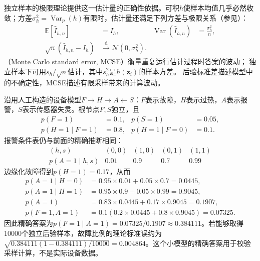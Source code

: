 独立样本的极限理论提供这一估计量的正确性依据。可积$h$使样本均值几乎必然收敛；方差$\sigma_h^2=\operatorname{Var}_p(h)$有限时，估计量还满足下列方差与极限关系（参见）：
\begin{equation}
  \begin{aligned}
    \mathbb{E}[\widehat I_{h,n}]&=I_h,&
    \operatorname{Var}(\widehat I_{h,n})&=\frac{\sigma_h^2}{n},\\
    \sqrt n(\widehat I_{h,n}-I_h)&\xrightarrow{\mathrm{d}}
      \mathcal{N}(0,\sigma_h^2).
  \end{aligned}
  \label{eq:pgm-sampling-iid-clt}
\end{equation}
（Monte Carlo standard error, MCSE）衡量重复运行估计过程时答案的波动；
独立样本下可用$s_h/\sqrt n$估计，其中$s_h^2$是$h(\bm z_i)$的样本方差。
后验标准差描述模型中的不确定性，MCSE描述有限采样带来的计算波动。


\begin{example}[报警后的故障概率]
  \label{ex:pgm-sampling-device}
  沿用人工构造的设备模型$F\to H\to A\leftarrow S$：$F$表示故障，$H$表示过热，$A$表示报警，$S$表示传感器失灵。根节点$F,S$独立，且
  \[
    \begin{aligned}
      p(F=1)&=0.1,&p(S=1)&=0.05,\\
      p(H=1\mid F=1)&=0.8,&
      p(H=1\mid F=0)&=0.1.
    \end{aligned}
  \]
  报警条件表仍与前面的精确推断相同：
  \[
    \begin{array}{ccccc}
      (h,s)&(0,0)&(1,0)&(0,1)&(1,1)\\
      p(A=1\mid h,s)&0.01&0.9&0.7&0.99
    \end{array}
  \]
  边缘化故障得到$p(H=1)=0.17$，从而
  \[
    \begin{aligned}
      p(A=1\mid H=0)&=0.95\times0.01+0.05\times0.7=0.0445,\\
      p(A=1\mid H=1)&=0.95\times0.9+0.05\times0.99=0.9045,\\
      p(A=1)&=0.83\times0.0445+0.17\times0.9045=0.1907,\\
      p(F=1,A=1)&=0.1(0.2\times0.0445+0.8\times0.9045)=0.07325.
    \end{aligned}
  \]
  因此精确答案为$p(F=1\mid A=1)=0.07325/0.1907\approx0.384111$。若能够取得$10000$个独立后验样本，故障比例的理论标准误约为$\sqrt{0.384111(1-0.384111)/10000}=0.004864$。这个小模型的精确答案用于校验采样计算，不是实际设备数据。
\end{example}

